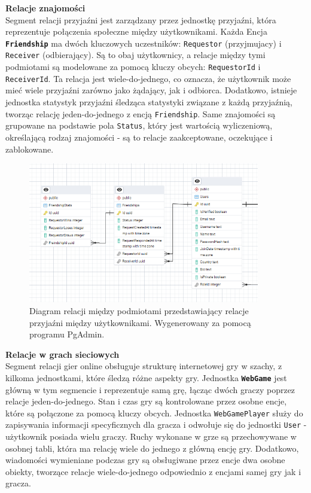 \documentclass[12pt,a4paper]{article}
\begin{document}
\newpage

\noindent \textbf{Relacje znajomości}\\
Segment relacji przyjaźni jest zarządzany przez jednostkę przyjaźni, która reprezentuje połączenia społeczne między użytkownikami. Każda Encja \textbf{\texttt{Friendship}} ma dwóch kluczowych uczestników: \texttt{Requestor} (przyjmujacy) i \texttt{Receiver} (odbierający). Są to obaj użytkownicy, a relacje między tymi podmiotami są modelowane za pomocą kluczy obcych: \texttt{RequestorId} i \texttt{ReceiverId}. Ta relacja jest wiele-do-jednego, co oznacza, że użytkownik może mieć wiele przyjaźni zarówno jako żądający, jak i odbiorca. Dodatkowo, istnieje jednostka statystyk przyjaźni śledząca statystyki związane z każdą przyjaźnią, tworząc relację jeden-do-jednego z encją \texttt{Friendship}. Same znajomości są grupowane na podstawie pola \texttt{Status}, który jest wartością wyliczeniową, określającą rodzaj znajomości - są to relacje zaakceptowane, oczekujące i zablokowane.

\vspace{0.5cm}
\begin{figure}[h!]
    \centering
    \includegraphics[width=0.9\textwidth]{images/ERD_friendship.png}
    \caption{Diagram relacji między podmiotami przedstawiający relacje przyjaźni między użytkownikami. Wygenerowany za pomocą programu PgAdmin.}
\end{figure}

\newpage

\noindent \textbf{Relacje w grach sieciowych}\\
Segment relacji gier online obsługuje strukturę internetowej gry w szachy, z kilkoma jednostkami, które śledzą różne aspekty gry. Jednostka \textbf{\texttt{WebGame}} jest główną w tym segmencie i reprezentuje samą grę, łącząc dwóch graczy poprzez relacje jeden-do-jednego. Stan i czas gry są kontrolowane przez osobne encje, które są połączone za pomocą kluczy obcych. Jednostka \texttt{WebGamePlayer} służy do zapisywania informacji specyficznych dla gracza i odwołuje się do jednostki \texttt{User} - użytkownik posiada wielu graczy. Ruchy wykonane w grze są przechowywane w osobnej tabli, która ma relację wiele do jednego z główną encję gry. Dodatkowo, wiadomości wymieniane podczas gry są obsługiwane przez encje dwa osobne obiekty, tworzące relacje wiele-do-jednego odpowiednio z encjami samej gry jak i gracza.
\end{document}
